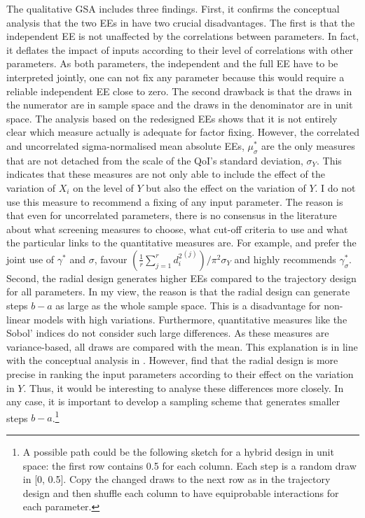 \noindent
The qualitative GSA includes three findings.
First, it confirms the conceptual analysis that the two EEs in \cite{ge2017extending} have two crucial disadvantages. The first is that the independent EE is not unaffected by the correlations between parameters. In fact, it deflates the impact of inputs according to their level of correlations with other parameters. As both parameters, the independent and the full EE have to be interpreted jointly, one can not fix any parameter because this would require a reliable independent EE close to zero. The second drawback is that the draws in the numerator are in sample space and the draws in the denominator are in unit space. The analysis based on the redesigned EEs shows that it is not entirely clear which measure actually is adequate for factor fixing. However, the correlated and uncorrelated sigma-normalised mean absolute EEs, $\mu_\sigma^*$ are the only measures that are not detached from the scale of the QoI's standard deviation, $\sigma_Y$. This indicates that these measures are not only able to include the effect of the variation of $X_i$ on the level of $Y$ but also the effect on the variation of $Y$. I do not use this measure to recommend a fixing of any input parameter. The reason is that even for uncorrelated parameters, there is no consensus in the literature about what screening measures to choose, what cut-off criteria to use and what the particular links to the quantitative measures are. For example, \cite{campolongo2007effective} and \cite{ge2017extending} prefer the joint use of $\gamma^*$ and $\sigma$, \cite{kucherenko2009derivative} favour $(\frac{1}{r} \sum_{j=1}^{r} {d_i^2}^{(j)})/\pi^2 \sigma_Y$ and \cite{Smith.2014} highly recommends $\gamma^*_{\sigma}$.\\

\noindent
Second, the radial design generates higher EEs compared to the trajectory design for all parameters. In my view, the reason is that the radial design can generate steps $b-a$ as large as the whole sample space. This is a disadvantage for non-linear models with high variations. Furthermore, quantitative measures like the Sobol' indices do not consider such large differences. As these measures are variance-based, all draws are compared with the mean. This explanation is in line with the conceptual analysis in \cite{kucherenko2009derivative}. However, \cite{campolongo2007effective} find that the radial design is more precise in ranking the input parameters according to their effect on the variation in $Y$. Thus, it would be interesting to analyse these differences more closely. In any case, it is important to develop a sampling scheme that generates smaller steps $b-a$.\footnote{A possible path could be the following sketch for a hybrid design in unit space: the first row contains 0.5 for each column. Each step is a random draw in [0, 0.5]. Copy the changed draws to the next row as in the trajectory design and then shuffle each column to have equiprobable interactions for each parameter.}\\

